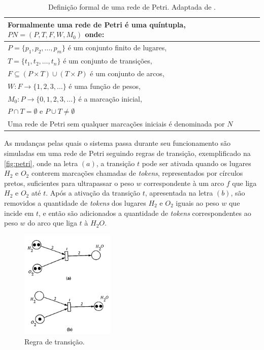 \begin{table}[ht]
    \centering
    \begin{tabular}{|l|}
         \hline
         Formalmente uma rede de Petri é uma quíntupla, $PN = (P,T,F,W,M_0)$ onde: \\ \hline
         $P = \{p_1,p_2,\ldots,p_m\}$ é um conjunto finito de lugares, \\
         $T = \{t_1,t_2,\ldots,t_n\}$ é um conjunto de transições, \\
         $F \subseteq (P \times T) \cup (T \times P)$ é um conjunto de arcos, \\
         $W: F \to \{1,2,3,\ldots\} $ é uma função de pesos, \\
         $M_0: P \to \{0,1,2,3,\ldots\}$ é a marcação inicial, \\
         $P \cap T = \emptyset$ e $P \cup T \neq \emptyset$ \\
         Uma rede de Petri sem qualquer marcações iniciais é denominada por $N$ \\
         \hline
    \end{tabular}
    \caption{Definição formal de uma rede de Petri. Adaptada de .}
    \label{tab:petri_form}
\end{table}

As mudanças pelas quais o sistema passa durante seu funcionamento são simuladas em uma rede de Petri seguindo regras de transição, exemplificado na \autoref{fig:petri}, onde na letra $(a)$, a transição $t$ pode ser ativada quando os lugares $H_2$ e $O_2$ conterem marcações chamadas de \textit{tokens}, representados por círculos pretos, suficientes para ultrapassar o peso $w$ correspondente à um arco $f$ que liga $H_2$ e $O_2$ até $t$. Após a ativação da transição $t$, apresentada na letra $(b)$, são removidos a quantidade de \textit{tokens} dos lugares $H_2$ e $O_2$ iguais ao peso $w$ que incide em $t$, e então são adicionados a quantidade de \textit{tokens} correspondentes ao peso $w$ do arco que liga $t$ à $H_2O$. \cite{murata:1989}

\begin{figure}[ht]
    \centering
    \includegraphics[width=0.4\textwidth, keepaspectratio]{resources/petri.png}
    \caption{Regra de transição. \cite{murata:1989}}
    \label{fig:petri}
\end{figure}

